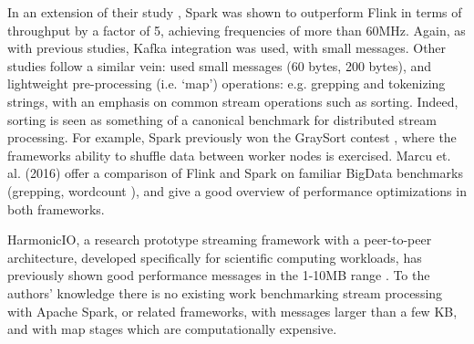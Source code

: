 \documentclass[letterpaper,conference]{IEEEtran}
\begin{document}
In an extension of their study \cite{grierExtendingYahooStreaming2016}, Spark was shown to outperform Flink in terms of throughput by a factor of 5, achieving frequencies of more than 60MHz. Again, as with previous studies, Kafka integration was used, with small messages.
Other studies follow a similar vein: \cite{qianBenchmarkingModernDistributed2016} used small messages (60 bytes, 200 bytes), and lightweight pre-processing (i.e. `map') operations: e.g. grepping and tokenizing strings, with an emphasis on common stream operations such as sorting. %
Indeed, sorting is seen as something of a canonical benchmark for distributed stream processing. For example, Spark previously won the GraySort contest \cite{xinApacheSparkFastest2014}, where the frameworks ability to shuffle%
data between worker nodes is exercised.
Marcu et. al. (2016)\nocite{marcuSparkFlinkUnderstanding2016} offer a comparison of Flink and Spark on familiar BigData benchmarks (grepping, wordcount%
), and give a good overview of performance optimizations in both frameworks. 

HarmonicIO, a research prototype streaming framework with a peer-to-peer architecture, developed 
specifically for scientific computing workloads, has previously shown good performance messages in the 1-10MB range \cite{torruangwatthanaHarmonicIOScalableData2018a}. To the authors' knowledge there is no existing work benchmarking stream processing with Apache Spark, or related frameworks, with messages larger than a few KB, and with map stages which are computationally expensive.

\end{document}
